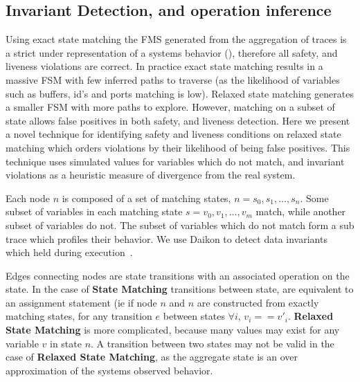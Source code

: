 
\subsection{Invariant Detection, and operation inference}

Using exact state matching the FMS generated from the aggregation of traces is
a strict under representation of a systems behavior (), therefore all safety, and liveness violations are
correct. In practice exact state matching results in a massive FSM with few
inferred paths to traverse (as the likelihood of variables such as buffers,
id's and ports matching is low). Relaxed state matching generates a smaller FSM
with more paths to explore. However, matching on a subset of state allows
false positives in both safety, and liveness detection. Here we present a novel
technique for identifying safety and liveness conditions on relaxed state
matching which orders violations by their likelihood of being false positives.
This technique uses simulated values for variables which do not match, and
invariant violations as a heuristic measure of divergence from the real system.

Each node $n$ is composed of a set of matching states, $n =
{s_0,s_1,\dots,s_n}$. Some subset of variables in each matching state $s =
{v_0,v_1,\dots,v_m}$ match, while another subset of variables do not. The
subset of variables which do not match form a sub trace which profiles their
behavior. We use Daikon to detect data invariants which held during
execution~\cite{Ernst07}.

Edges connecting nodes are state transitions with an associated operation on
the state. In the case of \textbf{State Matching} transitions between state,
are equivalent to an assignment statement (ie if node $n$ and $n$ are
constructed from exactly matching states, for any transition $e$ between states
$\forall i$, $v_i == v'_i$. \textbf{Relaxed State Matching} is more
complicated, because many values may exist for any variable $v$ in state $n$. A
transition between two states may not be valid in the case of \textbf{Relaxed
State Matching}, as the aggregate state is an over approximation of the systems
observed behavior.

